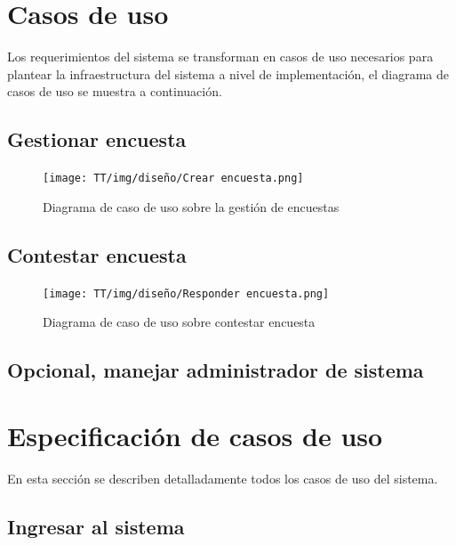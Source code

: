\section{Casos de uso}
Los requerimientos del sistema se transforman en casos de uso necesarios para plantear la infraestructura del sistema a nivel de implementación, el diagrama de casos de uso se muestra a continuación.

\subsection{Gestionar encuesta}

\begin{figure}[!ht]
    \centering
    \texttt{[image: TT/img/diseño/Crear encuesta.png]}
    \caption{Diagrama de caso de uso sobre la gestión de encuestas }
    \label{graphic:CU-D-gestionar-encuesta}
\end{figure}


\subsection{Contestar encuesta}

\begin{figure}[!ht]
    \centering
    \texttt{[image: TT/img/diseño/Responder encuesta.png]}
    \caption{Diagrama de caso de uso sobre contestar encuesta}
    \label{graphic:CU-D-contestar-encuesta}
\end{figure}

\subsection{Opcional, manejar administrador de sistema}

\section{Especificación de casos de uso}

En esta sección se describen detalladamente todos los casos de uso del sistema.

\subsection{Ingresar al sistema}

